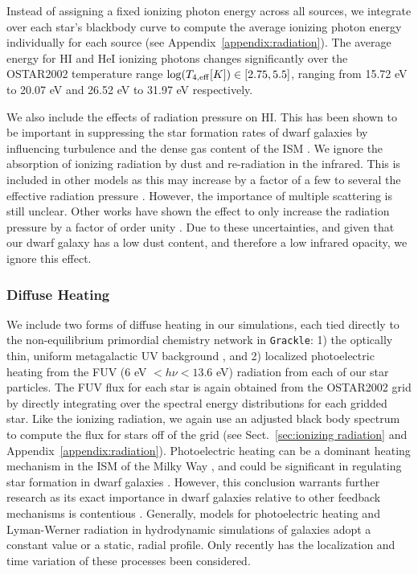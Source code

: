 \documentclass[fleqn,usenatbib,useAMS]{mnras}
\begin{document}
Instead of assigning a fixed ionizing photon energy across all sources, we integrate over each star's blackbody curve to compute the average ionizing photon energy individually for each source (see Appendix~\ref{appendix:radiation}). The average energy for HI and HeI ionizing photons changes significantly over the OSTAR2002 temperature range $\log(T_{4,\rm{eff}} [K]) \in \left[2.75,5.5\right]$, ranging from 15.72 eV to 20.07 eV and 26.52 eV to 31.97 eV respectively.

We also include the effects of radiation pressure on HI. This has been shown to be important in suppressing the star formation rates of dwarf galaxies by influencing turbulence and the dense gas content of the ISM \citep{WiseAbel2012,Ceverino2014}. We ignore the absorption of ionizing radiation by dust and re-radiation in the infrared. This is included in other models \citep[e.g.][]{Rosdahl2015,FIRE,FIRE2} as this may increase by a factor of a few to several the effective radiation pressure \citep{ZhangDavis2017}. However, the importance of multiple scattering is still unclear. Other works have shown the effect to only increase the radiation pressure by a factor of order unity \citep{Krumholz2012,Krumholz2013a,Reissl2017,Wibking2018}. Due to these uncertainties, and given that our dwarf galaxy has a low dust content, and therefore a low infrared opacity, we ignore this effect. 

\subsubsection{Diffuse  Heating}
\label{sec:diffusive heating}
We include two forms of diffuse heating in our simulations, each tied directly to the non-equilibrium primordial chemistry network in \texttt{Grackle}: 1) the optically thin, uniform metagalactic UV background \citep{HM2012}, and 2) localized photoelectric heating from the FUV (6 eV $<h\nu< 13.6$ eV) radiation from each of our star particles. The FUV flux for each star is again obtained from the OSTAR2002 grid by directly integrating over the spectral energy distributions for each gridded star. Like the ionizing radiation, we again use an adjusted black body spectrum to compute the flux for stars off of the grid (see Sect.~\ref{sec:ionizing radiation} and Appendix~\ref{appendix:radiation}). Photoelectric heating can be a dominant heating mechanism in the ISM of the Milky Way \citep{Parravano2003}, and could be significant in regulating star formation in dwarf galaxies \citep{Forbes2016}. However, this conclusion warrants further research as its exact importance in dwarf galaxies relative to other feedback mechanisms is contentious \citep{Hu2016,Hu2017}. Generally, models for photoelectric heating and Lyman-Werner radiation in hydrodynamic simulations of galaxies adopt a constant value or a static, radial profile. Only recently has the localization and time variation of these processes been considered.
\end{document}
